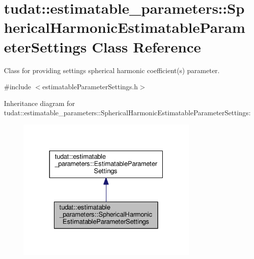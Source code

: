 \hypertarget{classtudat_1_1estimatable__parameters_1_1SphericalHarmonicEstimatableParameterSettings}{}\section{tudat\+:\+:estimatable\+\_\+parameters\+:\+:Spherical\+Harmonic\+Estimatable\+Parameter\+Settings Class Reference}
\label{classtudat_1_1estimatable__parameters_1_1SphericalHarmonicEstimatableParameterSettings}


Class for providing settings spherical harmonic coefficient(s) parameter.  




{\ttfamily \#include $<$estimatable\+Parameter\+Settings.\+h$>$}



Inheritance diagram for tudat\+:\+:estimatable\+\_\+parameters\+:\+:Spherical\+Harmonic\+Estimatable\+Parameter\+Settings\+:
\nopagebreak
\begin{figure}[H]
\begin{center}
\leavevmode
\includegraphics[width=253pt]{classtudat_1_1estimatable__parameters_1_1SphericalHarmonicEstimatableParameterSettings__inherit__graph}
\end{center}
\end{figure}


